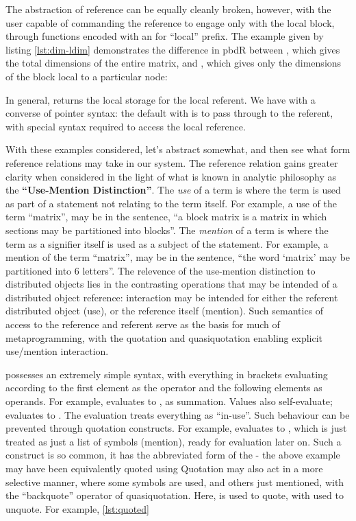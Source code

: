 The abstraction of reference can be equally cleanly broken, however,
with the user capable of commanding the reference to engage only with
the local block, through functions encoded with an  for
``local'' prefix. The example given by listing \cref{lst:dim-ldim} demonstrates the difference in
pbdR between , which gives the total dimensions of the
entire matrix, and , which gives only the dimensions of the
block local to a particular node:


In general,  returns the local storage for the
 local referent. We have with  a converse of
pointer syntax: the default with  is to pass through to the
referent, with special syntax required to access the local reference.

With these examples considered, let's abstract somewhat, and then see
what form reference relations may take in our system. The reference
relation gains greater clarity when considered in the light of what is
known in analytic philosophy as the \textbf{``Use-Mention
    Distinction''}. The \emph{use} of a term is where the term is used as
part of a statement not relating to the term itself. For example, a use
of the term ``matrix'', may be in the sentence, ``a block matrix is a
matrix in which sections may be partitioned into blocks''. The
\emph{mention} of a term is where the term as a signifier itself is used
as a subject of the statement. For example, a mention of the term
``matrix'', may be in the sentence, ``the word `matrix' may be
partitioned into 6 letters''. The relevence of the use-mention
distinction to distributed objects lies in the contrasting operations
that may be intended of a distributed object reference: interaction may
be intended for either the referent distributed object (use), or the
reference itself (mention). Such semantics of access to the reference
and referent serve as the basis for much of metaprogramming, with the
 quotation and quasiquotation enabling explicit use/mention
interaction.

 possesses an extremely simple syntax, with everything in brackets
evaluating according to the first element as the operator and the
following elements as operands. For example, 
evaluates to , as summation. Values also self-evaluate;
 evaluates to . The evaluation treats everything as
``in-use''. Such behaviour can be prevented through quotation
constructs. For example,  evaluates to
, which is just treated as just a list of symbols
(mention), ready for evaluation later on. Such a construct is so common,
it has the abbreviated form of the  - the
above example may have been equivalently quoted using
 Quotation may also act in a
more selective manner, where some symbols are used, and others just
mentioned, with the ``backquote'' operator of quasiquotation. Here,
 is used to quote, with  used to
unquote. For example, \cref{lst:quoted}

